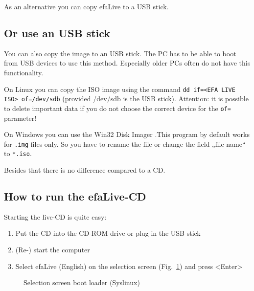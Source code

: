\documentclass[a4paper,12pt,twoside]{article}
\begin{document}
As an alternative you can copy efaLive to a USB stick.


\subsection{Or use an USB stick}
\label{sct:usb_stick}
You can also copy the image to an USB stick. The
PC has to be able to boot from USB devices to use this method.
Especially older PCs often do not have this functionality.

On Linux you can copy the ISO image using the command \texttt{dd
if={\textless}EFA LIVE ISO{\textgreater} of=/dev/sdb}
(provided /dev/sdb is the USB stick). Attention: it is possible to
delete important data if you do not choose the correct device for the
\texttt{of=} parameter!

On Windows you can use the Win32 Disk Imager \cite{IMG1}.This program by
default works for \texttt{.img} files only. So you
have to rename the file or change the field „file name“ to
\texttt{*.iso}.

Besides that there is no difference compared to a CD.


\subsection{How to run the efaLive-CD}
\label{sct:live_run}
Starting the live-CD is quite easy:

\begin{enumerate}
    \item Put the CD into the CD-ROM drive or plug in the USB stick
    \item (Re-) start the computer
    \item Select efaLive (English) on the selection screen
(Fig.~\ref{fig:syslinux}) and press {\textless}Enter{\textgreater}
\end{enumerate}

\begin{figure}
    \centering
    \caption{Selection screen boot loader (Syslinux)}
    \label{fig:syslinux}
\end{figure}
\end{document}
